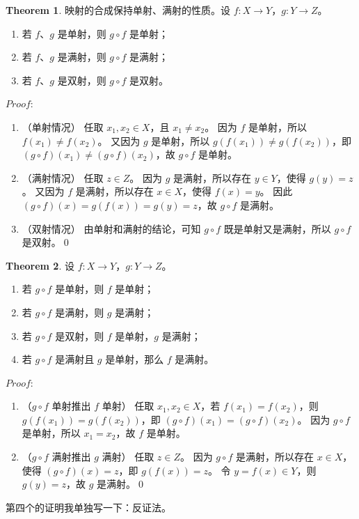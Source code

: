 \documentclass[oneside]{book}
\theoremstyle{definition}
\newtheorem{theorem}{Theorem}[section]
\begin{document}
	\begin{theorem}
		映射的合成保持单射、满射的性质。设 \( f: X \to Y \)，\( g: Y \to Z \)。
		\begin{enumerate}
			\item 若 \( f \)、\( g \) 是单射，则 \( g \circ f \) 是单射；
			\item 若 \( f \)、\( g \) 是满射，则 \( g \circ f \) 是满射；
			\item 若 \( f \)、\( g \) 是双射，则 \( g \circ f \) 是双射。
		\end{enumerate}
	\end{theorem}
	
	$Proof:$
		\begin{enumerate}
			\item （单射情况）
			任取 \( x_1, x_2 \in X \)，且 \( x_1 \neq x_2 \)。
			因为 \( f \) 是单射，所以 \( f(x_1) \neq f(x_2) \)。
			又因为 \( g \) 是单射，所以 \( g(f(x_1)) \neq g(f(x_2)) \)，即 \( (g \circ f)(x_1) \neq (g \circ f)(x_2) \)，故 \( g \circ f \) 是单射。
			\item （满射情况）
			任取 \( z \in Z \)。
			因为 \( g \) 是满射，所以存在 \( y \in Y \)，使得 \( g(y) = z \)。
			又因为 \( f \) 是满射，所以存在 \( x \in X \)，使得 \( f(x) = y \)。
			因此 \( (g \circ f)(x) = g(f(x)) = g(y) = z \)，故 \( g \circ f \) 是满射。
			\item （双射情况）
			由单射和满射的结论，可知 \( g \circ f \) 既是单射又是满射，所以 \( g \circ f \) 是双射。\qed
		\end{enumerate}
	
	\begin{theorem}
		设 \( f: X \to Y \)，\( g: Y \to Z \)。
		\begin{enumerate}
			\item 若 \( g \circ f \) 是单射，则 \( f \) 是单射；
			\item 若 \( g \circ f \) 是满射，则 \( g \) 是满射；
			\item 若 \( g \circ f \) 是双射，则 \( f \) 是单射，\( g \) 是满射；
			\item 若 \( g \circ f \) 是满射且 \( g \) 是单射，那么 \( f \) 是满射。
		\end{enumerate}
	\end{theorem}
	
	$Proof:$
		\begin{enumerate}
			\item （\( g \circ f \) 单射推出 \( f \) 单射） 
			任取 \( x_1, x_2 \in X \)，若 \( f(x_1) = f(x_2) \)，则 \( g(f(x_1)) = g(f(x_2)) \)，即 \( (g \circ f)(x_1) = (g \circ f)(x_2) \)。
			因为 \( g \circ f \) 是单射，所以 \( x_1 = x_2 \)，故 \( f \) 是单射。
			\item （\( g \circ f \) 满射推出 \( g \) 满射）
			任取 \( z \in Z \)。
			因为 \( g \circ f \) 是满射，所以存在 \( x \in X \)，使得 \( (g \circ f)(x) = z \)，即 \( g(f(x)) = z \)。
			令 \( y = f(x) \in Y \)，则 \( g(y) = z \)，故 \( g \) 是满射。\qed
		\end{enumerate}
	第四个的证明我单独写一下：反证法。
\end{document}

